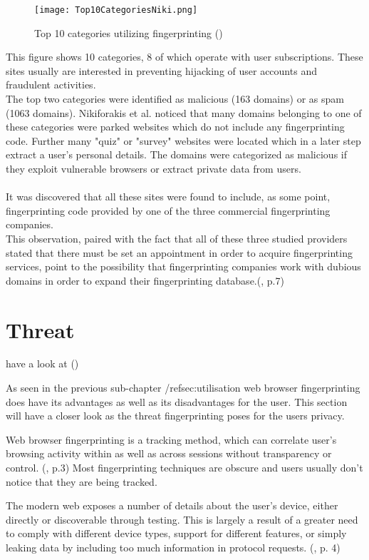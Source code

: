 \begin{figure}[H]
\centering
		\texttt{[image: Top10CategoriesNiki.png]}
		\caption{Top 10 categories utilizing fingerprinting (\textcite{Top10Niki})}
		\label{Top10Niki}
\end{figure}
This figure shows 10 categories, 8 of which operate with user subscriptions. These sites usually are interested in preventing hijacking of user accounts and fraudulent activities.\\
The top two categories were identified as malicious (163 domains) or as spam (1063 domains). Nikiforakis et al. noticed that many domains belonging to one of these categories were parked websites which do not include any fingerprinting code. Further many "quiz" or "survey" websites were located which in a later step extract a user's personal details. The domains were categorized as malicious if they exploit vulnerable browsers or extract private data from users.\\\\
It was discovered that all these sites were found to include, as some point, fingerprinting code provided by one of the three commercial fingerprinting companies.\\
This observation, paired with the fact that all of these three studied providers stated that there must be set an appointment in order to acquire fingerprinting services, point to the possibility that fingerprinting companies work with dubious domains in order to expand their fingerprinting database.(\textcite{nikiforakis13}, p.7)


\section{Threat}
have a look at (\textcite{eckersley10})

As seen in the previous sub-chapter /ref{sec:utilisation} web browser fingerprinting does have its advantages as well as its disadvantages for the user. This section will have a closer look as the threat fingerprinting poses for the users privacy.
 
Web browser fingerprinting is a tracking method, which can correlate user's browsing activity within as well as across sessions without transparency or control. (\textcite{doty18}, p.3) Most fingerprinting techniques are obscure and users usually don't notice that they are being tracked.

The modern web exposes a number of details about the user’s device, either directly or discoverable through testing. This is largely a result of a greater need to comply with different device types, support for different features, or simply leaking data by including too much information in protocol requests.
(\textcite{havens16}, p. 4)
 
